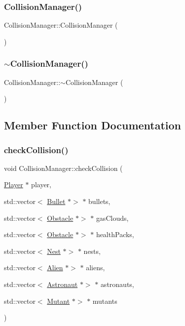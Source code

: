 \subsubsection{\texorpdfstring{Collision\+Manager()}{CollisionManager()}}
{\footnotesize\ttfamily Collision\+Manager\+::\+Collision\+Manager (\begin{DoxyParamCaption}{ }\end{DoxyParamCaption})}

\mbox{\label{class_collision_manager_acdbb3c842f0ef1c7a028d3f080855766}} 
\subsubsection{\texorpdfstring{$\sim$\+Collision\+Manager()}{~CollisionManager()}}
{\footnotesize\ttfamily Collision\+Manager\+::$\sim$\+Collision\+Manager (\begin{DoxyParamCaption}{ }\end{DoxyParamCaption})}



\subsection{Member Function Documentation}
\mbox{\label{class_collision_manager_afc1b2d0d08aeed558617c071a68f0d98}} 
\subsubsection{\texorpdfstring{check\+Collision()}{checkCollision()}}
{\footnotesize\ttfamily void Collision\+Manager\+::check\+Collision (\begin{DoxyParamCaption}\item[{\hyperlink{class_player}{Player} $\ast$}]{player,  }\item[{std\+::vector$<$ \hyperlink{class_bullet}{Bullet} $\ast$$>$ $\ast$}]{bullets,  }\item[{std\+::vector$<$ \hyperlink{class_obstacle}{Obstacle} $\ast$$>$ $\ast$}]{gas\+Clouds,  }\item[{std\+::vector$<$ \hyperlink{class_obstacle}{Obstacle} $\ast$$>$ $\ast$}]{health\+Packs,  }\item[{std\+::vector$<$ \hyperlink{class_nest}{Nest} $\ast$$>$ $\ast$}]{nests,  }\item[{std\+::vector$<$ \hyperlink{class_alien}{Alien} $\ast$$>$ $\ast$}]{aliens,  }\item[{std\+::vector$<$ \hyperlink{class_astronaut}{Astronaut} $\ast$$>$ $\ast$}]{astronauts,  }\item[{std\+::vector$<$ \hyperlink{class_mutant}{Mutant} $\ast$$>$ $\ast$}]{mutants }\end{DoxyParamCaption})}

